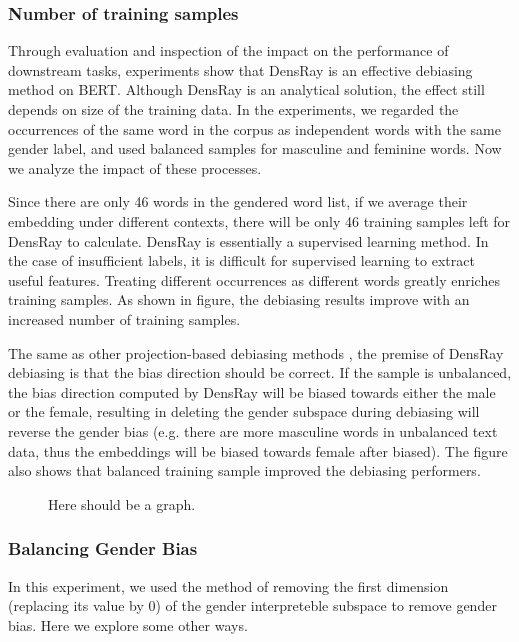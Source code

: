 \subsubsection{Number of training samples}
Through evaluation and inspection of the impact on the performance of downstream tasks, experiments show that DensRay is an effective debiasing method on BERT. Although DensRay is an analytical solution, the effect still depends on size of the training data. In the experiments, we regarded the occurrences of the same word in the corpus as independent words with the same gender label, and used balanced samples for masculine and feminine words. Now we analyze the impact of these processes.

Since there are only 46 words in the gendered word list, if we average their embedding under different contexts, there will be only 46 training samples left for DensRay to calculate. DensRay is essentially a supervised learning method. In the case of insufficient labels, it is difficult for supervised learning to extract useful features. Treating different occurrences as different words greatly enriches training samples. As shown in figure, the debiasing results improve with an increased number of training samples.

The same as other projection-based debiasing methods \citep{bolukbasi2016man,zhao2019gender,dev2019attenuating, karve2019conceptor}, the premise of DensRay debiasing is that the bias direction should be correct. If the sample is unbalanced, the bias direction computed by DensRay will be biased towards either the male or the female, resulting in deleting the gender subspace during debiasing will reverse the gender bias (e.g. there are more masculine words in unbalanced text data, thus the embeddings will be biased towards female after biased). The figure also shows that balanced training sample improved the debiasing performers. 
\begin{figure}
    \centering
    \caption{Here should be a graph.}
    \label{fig:my_label}
\end{figure}

\subsubsection{Balancing Gender Bias}
In this experiment, we used the method of removing the first dimension (replacing its value by $0$) of the gender interpreteble subspace to remove gender bias. Here we explore some other ways.

